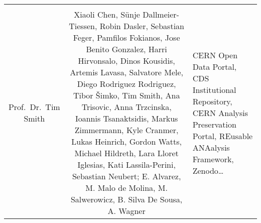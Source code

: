 \documentclass[
]{article}
\begin{document}
\begin{longtable}[]{@{}ccl@{}}
\begin{minipage}[t]{0.37\columnwidth}
\end{minipage}\tabularnewline
\begin{minipage}[t]{0.18\columnwidth}\centering
Prof.~Dr.~Tim Smith\strut
\end{minipage} & \begin{minipage}[t]{0.37\columnwidth}\centering
Xiaoli Chen, Sünje Dallmeier-Tiessen, Robin Dasler, Sebastian Feger,
Pamfilos Fokianos, Jose Benito Gonzalez, Harri Hirvonsalo, Dinos
Kousidis, Artemis Lavasa, Salvatore Mele, Diego Rodriguez Rodriguez,
Tibor Šimko, Tim Smith, Ana Trisovic, Anna Trzcinska, Ioannis
Tsanaktsidis, Markus Zimmermann, Kyle Cranmer, Lukas Heinrich, Gordon
Watts, Michael Hildreth, Lara Lloret Iglesias, Kati Lassila-Perini,
Sebastian Neubert; E. Alvarez, M. Malo de Molina, M. Salwerowicz, B.
Silva De Sousa, A. Wagner\strut
\end{minipage} & \begin{minipage}[t]{0.37\columnwidth}\raggedright
CERN Open Data Portal, CDS Institutional Repository, CERN Analysis
Preservation Portal, REusable ANAalysis Framework, Zenodo\ldots{}\strut
\end{minipage}\tabularnewline
\bottomrule
\end{longtable}
\end{document}
